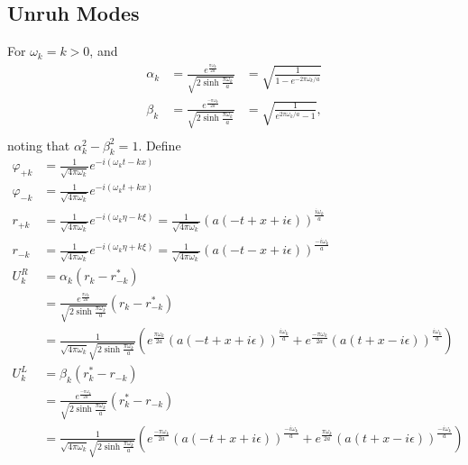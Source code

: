 \documentclass[12pt,a4paper]{article}
\begin{document}
\subsection{Unruh Modes}
For $\omega_k = k > 0$, and
\begin{equation}
  \begin{array}{lll}
    \alpha_k &= \frac{e^{\frac{\pi\omega_k}{2a}}}{\sqrt{2 \sinh \frac{\pi \omega_k}{a}}} &= \sqrt{\frac{1}{1 - e^{-2\pi\omega_k / a}}} \\
    \beta_k &= \frac{e^{\frac{-\pi\omega_k}{2a}}}{\sqrt{2 \sinh \frac{\pi \omega_k}{a}}} &= \sqrt{\frac{1}{e^{2\pi\omega_k / a} - 1}}, \\
  \end{array}
\end{equation}
noting that $\alpha_k^2 - \beta_k^2 = 1$.  Define
\begin{equation}
  \begin{array}{ll}
    \varphi_{+k} &= \frac{1}{\sqrt{4 \pi \omega_k}} e^{-i(\omega_k t - k x)}\\
    \varphi_{-k} &= \frac{1}{\sqrt{4 \pi \omega_k}} e^{-i(\omega_k t + k x)}\\
    r_{+k} &= \frac{1}{\sqrt{4 \pi \omega_k}} e^{-i(\omega_k \eta - k \xi)} = \frac{1}{\sqrt{4 \pi \omega_k}} (a(-t + x + i \epsilon))^{\frac{i \omega_k}{a}} \\
    r_{-k} &= \frac{1}{\sqrt{4 \pi \omega_k}} e^{-i(\omega_k \eta + k \xi)} = \frac{1}{\sqrt{4 \pi \omega_k}} (a(-t - x + i \epsilon))^{\frac{-i \omega_k}{a}} \\
    U^R_k &= \alpha_k (r_k - r_{-k}^*) \\
    &= \frac{e^{\frac{\pi \omega_k}{2a}}}{\sqrt{2 \sinh \frac{\pi \omega_k}{a}}} \left(r_k - r_{-k}^* \right) \\
    &= \frac{1}{\sqrt{4 \pi \omega_k}\sqrt{2 \sinh \frac{\pi \omega_k}{a}}} \left( e^{\frac{\pi \omega_k}{2a}} \left(a(-t+x+i\epsilon)\right)^{\frac{i\omega_k}{a}} + e^{\frac{-\pi \omega_k}{2a}} \left(a(t+x-i\epsilon)\right)^{\frac{i\omega_k}{a}} \right) \\
    U^L_k &= \beta_k (r_k^* - r_{-k} )\\
    &=\frac{e^{\frac{-\pi \omega_k}{2a}}}{\sqrt{2 \sinh \frac{\pi \omega_k}{a}}} \left(r_k^* - r_{-k} \right) \\
    &=\frac{1}{\sqrt{4 \pi \omega_k}\sqrt{2 \sinh \frac{\pi \omega_k}{a}}} \left( e^{\frac{-\pi \omega_k}{2a}} \left(a(-t+x+i\epsilon)\right)^{\frac{-i\omega_k}{a}} + e^{\frac{\pi \omega_k}{2a}} \left(a(t+x-i\epsilon)\right)^{\frac{-i\omega_k}{a}} \right) \\
  \end{array}
\end{equation}
\end{document}
